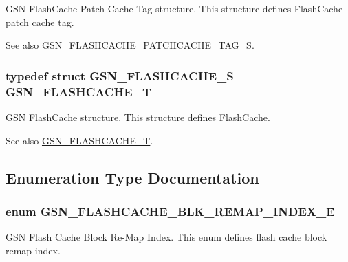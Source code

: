 GSN FlashCache Patch Cache Tag structure. This structure defines FlashCache patch cache tag. 

\begin{DoxySeeAlso}{See also}
\hyperlink{a00076}{GSN\_\-FLASHCACHE\_\-PATCHCACHE\_\-TAG\_\-S}. 
\end{DoxySeeAlso}
\hypertarget{a00646_gab86e11d61e9a3e75985fb1ef6a081165}{
\subsubsection[{GSN\_\-FLASHCACHE\_\-T}]{\setlength{\rightskip}{0pt plus 5cm}typedef struct {\bf GSN\_\-FLASHCACHE\_\-S}  {\bf GSN\_\-FLASHCACHE\_\-T}}}
\label{a00646_gab86e11d61e9a3e75985fb1ef6a081165}


GSN FlashCache structure. This structure defines FlashCache. 

\begin{DoxySeeAlso}{See also}
\hyperlink{a00646_gab86e11d61e9a3e75985fb1ef6a081165}{GSN\_\-FLASHCACHE\_\-T}. 
\end{DoxySeeAlso}


\subsection{Enumeration Type Documentation}
\hypertarget{a00646_ga2fbb2a317075d9d8046e4586d991856b}{
\subsubsection[{GSN\_\-FLASHCACHE\_\-BLK\_\-REMAP\_\-INDEX\_\-E}]{\setlength{\rightskip}{0pt plus 5cm}enum {\bf GSN\_\-FLASHCACHE\_\-BLK\_\-REMAP\_\-INDEX\_\-E}}}
\label{a00646_ga2fbb2a317075d9d8046e4586d991856b}


GSN Flash Cache Block Re-\/Map Index. This enum defines flash cache block remap index. 

